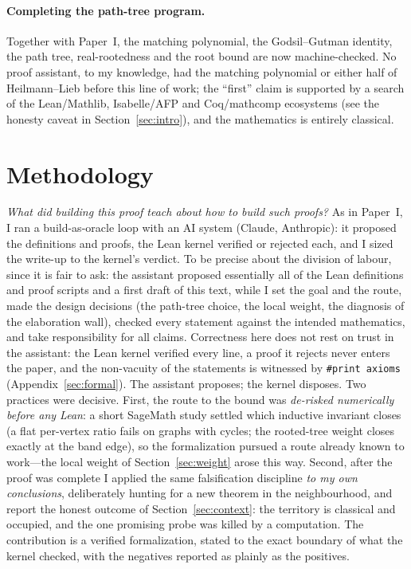 \documentclass[11pt]{article}
\newcommand{\lean}[1]{{\def\_{\textunderscore\allowbreak}\texttt{#1}}}
\begin{document}
\paragraph{Completing the path-tree program.} Together with Paper~I, the matching
polynomial, the Godsil--Gutman identity, the path tree, real-rootedness and the
root bound are now machine-checked. No proof assistant, to my knowledge, had the
matching polynomial or either half of Heilmann--Lieb before this line of work; the
``first'' claim is supported by a search of the Lean/Mathlib, Isabelle/AFP and
Coq/mathcomp ecosystems (see the honesty caveat in Section~\ref{sec:intro}), and
the mathematics is entirely classical.

\section{Methodology}
\label{sec:method}

\emph{What did building this proof teach about how to build such proofs?}
As in Paper~I, I ran a build-as-oracle loop with an AI system (Claude, Anthropic):
it proposed the definitions and proofs, the Lean kernel verified or rejected each,
and I sized the write-up to the kernel's verdict. To be precise about the division
of labour, since it is fair to ask: the assistant proposed essentially all of the
Lean definitions and proof scripts and a first draft of this text, while I set the
goal and the route, made the design decisions (the path-tree choice, the local
weight, the diagnosis of the elaboration wall), checked every statement against the
intended mathematics, and take responsibility for all claims. Correctness here does
not rest on trust in the assistant: the Lean kernel verified every line, a proof it
rejects never enters the paper, and the non-vacuity of the statements is witnessed
by \lean{\#print axioms} (Appendix~\ref{sec:formal}). The assistant proposes; the
kernel disposes. Two
practices were decisive. First, the route to the bound was \emph{de-risked
numerically before any Lean}: a short SageMath study settled which inductive
invariant closes (a flat per-vertex ratio fails on graphs with cycles; the
rooted-tree weight closes exactly at the band edge), so the formalization pursued a
route already known to work---the local weight of Section~\ref{sec:weight} arose
this way. Second, after the proof was complete I applied the same falsification
discipline \emph{to my own conclusions}, deliberately hunting for a new theorem in
the neighbourhood, and report the honest outcome of Section~\ref{sec:context}: the
territory is classical and occupied, and the one promising probe was killed by a
computation. The contribution is a verified formalization, stated to the exact
boundary of what the kernel checked, with the negatives reported as plainly as the
positives.
\end{document}
